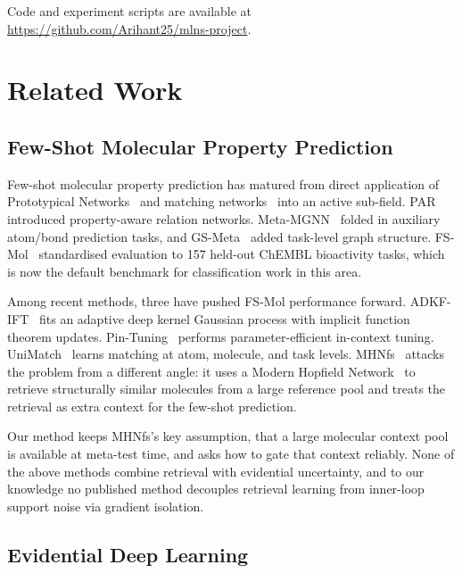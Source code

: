 \documentclass{article}
\theoremstyle{plain}
\theoremstyle{definition}
\theoremstyle{remark}
\begin{document}
Code and experiment scripts are available at \url{https://github.com/Arihant25/mlns-project}.

\section{Related Work}
\label{sec:related}

\subsection{Few-Shot Molecular Property Prediction}

Few-shot molecular property prediction has matured from direct application of Prototypical Networks~\citep{snell2017protonet} and matching networks~\citep{vinyals2016matching} into an active sub-field. PAR~\citep{wang2021par} introduced property-aware relation networks. Meta-MGNN~\citep{guo2021metamgnn} folded in auxiliary atom/bond prediction tasks, and GS-Meta~\citep{zhuang2023gsmeta} added task-level graph structure. FS-Mol~\citep{stanley2021fsmol} standardised evaluation to 157 held-out ChEMBL bioactivity tasks, which is now the default benchmark for classification work in this area.

Among recent methods, three have pushed FS-Mol performance forward. ADKF-IFT~\citep{chen2023adkfift} fits an adaptive deep kernel Gaussian process with implicit function theorem updates. Pin-Tuning~\citep{wang2024pintuning} performs parameter-efficient in-context tuning. UniMatch~\citep{unimatch2025} learns matching at atom, molecule, and task levels. MHNfs~\citep{schimunek2023mhnfsiclr,schimunek2024mhnfs} attacks the problem from a different angle: it uses a Modern Hopfield Network~\citep{ramsauer2021hopfield} to retrieve structurally similar molecules from a large reference pool and treats the retrieval as extra context for the few-shot prediction.

Our method keeps MHNfs's key assumption, that a large molecular context pool is available at meta-test time, and asks how to gate that context reliably. None of the above methods combine retrieval with evidential uncertainty, and to our knowledge no published method decouples retrieval learning from inner-loop support noise via gradient isolation.

\subsection{Evidential Deep Learning}
\end{document}

